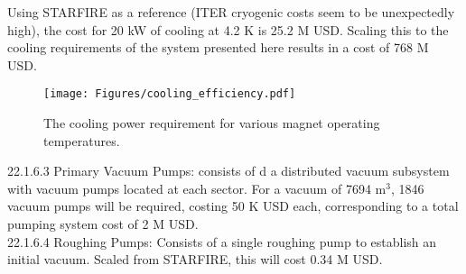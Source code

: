 Using STARFIRE as a reference (ITER cryogenic costs seem to be unexpectedly high), the cost for 20 kW of cooling at 4.2 K is 25.2 M USD. Scaling this to the cooling requirements of the system presented here results in a cost of 768 M USD. \\

\begin{figure}[h]
    \centering
    \texttt{[image: Figures/cooling\_efficiency.pdf]}
    \caption{The cooling power requirement for various magnet operating temperatures.}
    \label{fig:cool_eff}
\end{figure}



22.1.6.3 Primary Vacuum Pumps: consists of d a distributed vacuum subsystem with vacuum pumps located at each sector. For a vacuum of 7694 m$^3$, 1846 vacuum pumps will be required, costing 50 K USD each, corresponding to a total pumping system cost of 2 M USD.\\

22.1.6.4 Roughing Pumps: Consists of a single roughing pump to establish an initial vacuum. Scaled from STARFIRE, this will cost 0.34 M USD.

